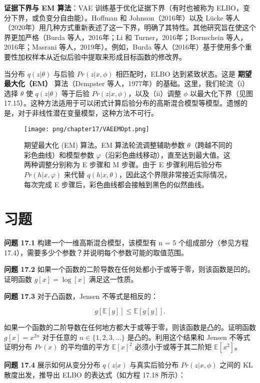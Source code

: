 \textbf{证据下界与 EM 算法}：VAE 训练基于优化证据下界（有时也被称为 ELBO，变分下界，或负变分自由能）。Hoffman 和 Johnson（2016年）以及 Lücke 等人（2020年）用几种方式重新表述了这一下界，明确了其特性。其他研究旨在使这个界更加严格（Burda 等人，2016年；Li 和 Turner，2016年；Bornschein 等人，2016年；Masrani 等人，2019年）。例如，Burda 等人（2016年）基于使用多个重要性加权样本从近似后验中提取来形成目标函数的修改界。

当分布 \(q(z|\theta)\) 与后验 \(Pr(z|x, \phi)\) 相匹配时，ELBO 达到紧致状态。这是 \textbf{期望最大化（EM）} 算法（Dempster 等人，1977年）的基础。这里，我们轮流（i）选择 \(\theta\) 使 \(q(z|\theta)\) 等于后验 \(Pr(z|x, \phi)\)，以及（ii）调整 \(\phi\) 以最大化下界（见图 17.15）。这种方法适用于可以闭式计算后验分布的高斯混合模型等模型。遗憾的是，对于非线性潜在变量模型，这种方法不可行。

\begin{figure}[ht!]
\centering
\texttt{[image: png/chapter17/VAEEMOpt.png]}
\caption{期望最大化 (EM) 算法。EM 算法轮流调整辅助参数 \(\theta\)（跨越不同的彩色曲线）和模型参数 \(\varphi\)（沿彩色曲线移动），直至达到最大值。这两种调整分别称为 E 步骤和 M 步骤。由于 E 步骤利用后验分布 \(Pr(h|x, \varphi)\) 来代替 \(q(h|x, \theta)\)，因此这个界限非常接近实际情况，每次完成 E 步骤后，彩色曲线都会接触到黑色的似然曲线。}
\end{figure}

\section{习题}  
\textbf{问题 17.1} 构建一个一维高斯混合模型，该模型有 n = 5 个组成部分（参见方程 17.4），需要多少个参数？并说明每个参数可能的取值范围。

\textbf{问题 17.2} 如果一个函数的二阶导数在任何处都小于或等于零，则该函数是凹的。证明函数 \(g[x] = \log[x]\) 满足这一性质。

\textbf{问题 17.3} 对于凸函数，Jensen 不等式是相反的：

\begin{equation}
g[\mathbb{E}[y]] \leq \mathbb{E}[g[y]]. 
\end{equation}

如果一个函数的二阶导数在任何地方都大于或等于零，则该函数是凸的。证明函数 \(g[x] = x^{2n}\) 对于任意的 \(n \in \{1, 2, 3, \ldots\}\) 是凸的。利用这个结果和 Jensen 不等式证明分布 \(Pr(x)\) 的平均值的平方 \(\mathbb{E}[x]^2\) 必须小于或等于其二阶矩 \(\mathbb{E}[x^2]\)。

\textbf{问题 17.4} 展示如何从变分分布 \(q(z|x)\) 与真实后验分布 \(Pr(z|x, \phi)\) 之间的 KL 散度出发，推导出 ELBO 的表达式（如方程 17.18 所示）：

